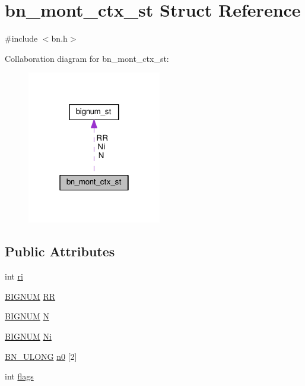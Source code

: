\hypertarget{structbn__mont__ctx__st}{}\section{bn\+\_\+mont\+\_\+ctx\+\_\+st Struct Reference}
\label{structbn__mont__ctx__st}


{\ttfamily \#include $<$bn.\+h$>$}



Collaboration diagram for bn\+\_\+mont\+\_\+ctx\+\_\+st\+:
\nopagebreak
\begin{figure}[H]
\begin{center}
\leavevmode
\includegraphics[width=166pt]{structbn__mont__ctx__st__coll__graph}
\end{center}
\end{figure}
\subsection*{Public Attributes}
\begin{DoxyCompactItemize}
\item 
int \hyperlink{structbn__mont__ctx__st_a62ed733165c48fa02734f7374b81dbe3}{ri}
\item 
\hyperlink{ossl__typ_8h_a6fb19728907ec6515e4bfb716bffa141}{B\+I\+G\+N\+UM} \hyperlink{structbn__mont__ctx__st_a80618d14450f431dfbd94cf22f603dda}{RR}
\item 
\hyperlink{ossl__typ_8h_a6fb19728907ec6515e4bfb716bffa141}{B\+I\+G\+N\+UM} \hyperlink{structbn__mont__ctx__st_ab39e1c073bfde3c58c515d52f129e5fb}{N}
\item 
\hyperlink{ossl__typ_8h_a6fb19728907ec6515e4bfb716bffa141}{B\+I\+G\+N\+UM} \hyperlink{structbn__mont__ctx__st_addf9ef45809c717971be3b8b724db8cd}{Ni}
\item 
\hyperlink{bn_8h_a59d6cc22b9b74e72363092a494a04165}{B\+N\+\_\+\+U\+L\+O\+NG} \hyperlink{structbn__mont__ctx__st_a728405e4c4ef9cf589c09b42afe109e0}{n0} \mbox{[}2\mbox{]}
\item 
int \hyperlink{structbn__mont__ctx__st_a8b43cc0971930aacb1fb2188e610dc8c}{flags}
\end{DoxyCompactItemize}


